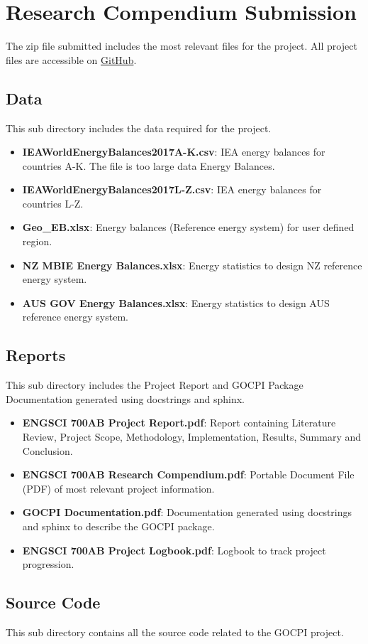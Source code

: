 \documentclass[12pt]{article}
\begin{document}
\tableofcontents
\listoffigures
\newpage
\section{Research Compendium Submission}
The zip file submitted includes the most relevant files for the project.
All project files are accessible on \href{https://github.com/CMCD1996/GOCPI}{GitHub}.
\subsection{Data}
This sub directory includes the data required for the project.
\begin{itemize}
    \item \textbf{IEAWorldEnergyBalances2017A-K.csv}: IEA energy balances for countries A-K. The file is too large data Energy Balances.
    \item \textbf{IEAWorldEnergyBalances2017L-Z.csv}: IEA energy balances for countries L-Z.
    \item \textbf{Geo\_EB.xlsx}: Energy balances (Reference energy system) for user defined region.
    \item \textbf{NZ MBIE Energy Balances.xlsx}: Energy statistics to design NZ reference energy system.
    \item \textbf{AUS GOV Energy Balances.xlsx}: Energy statistics to design AUS reference energy system.
\end{itemize}
\subsection{Reports}
This sub directory includes the Project Report and GOCPI Package Documentation generated using docstrings and sphinx.
\begin{itemize}
    \item \textbf{ENGSCI 700AB Project Report.pdf}: Report containing Literature Review, Project Scope, Methodology, Implementation, Results, Summary and Conclusion.
    \item \textbf{ENGSCI 700AB Research Compendium.pdf}: Portable Document File (PDF) of most relevant project information.
    \item \textbf{GOCPI Documentation.pdf}: Documentation generated using docstrings and sphinx to describe the GOCPI package.
    \item \textbf{ENGSCI 700AB Project Logbook.pdf}: Logbook to track project progression.
\end{itemize}
\subsection{Source Code}
This sub directory contains all the source code related to the GOCPI project.
\end{document}
